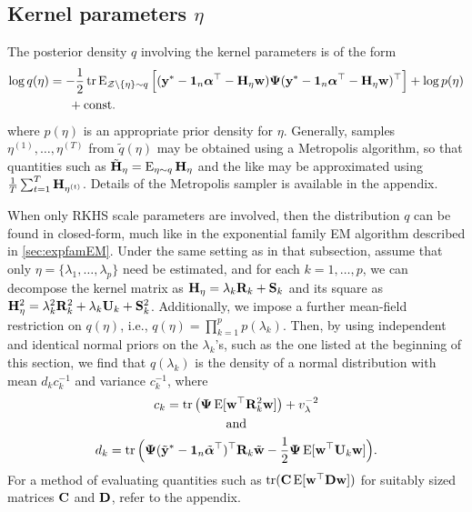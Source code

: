\subsection{Kernel parameters $\eta$}
\label{sec:varupdeta}

The posterior density $q$ involving the kernel parameters is of the form
\begin{align*}
  \log q(\eta) 
  &=  -\frac{1}{2}\operatorname{tr}\operatorname{E}_{{\mathcal Z}\backslash\{\eta\}\sim q} \Big[ 
  ({\mathbf y}^* - {\mathbf 1}_n{\bm\alpha}^\top - {\mathbf H}_\eta{\mathbf w}) {\bm\Psi} ({\mathbf y}^* - {\mathbf 1}_n{\bm\alpha}^\top - {\mathbf H}_\eta{\mathbf w})^\top \Big] + \log p(\eta) \\
  &\phantom{==} + \text{const.}\hspace{0.01em}
\end{align*}
where $p(\eta)$ is an appropriate prior density for $\eta$.
Generally, samples $\eta^{(1)},\dots,\eta^{(T)}$ from $\tilde q(\eta)$ may be obtained using a Metropolis algorithm, so that quantities such as $\tilde{{\mathbf H}}_{\eta} = \operatorname{E}_{\eta \sim q} {\mathbf H}_{\eta}$ and the like may be approximated using $\frac{1}{T}\sum_{t=1}^T {\mathbf H}_{\eta^{(t)}}$.
Details of the Metropolis sampler is available in the appendix.

When only RKHS scale parameters are involved, then the distribution $q$ can be found in closed-form, much like in the exponential family EM algorithm described in \cref{sec:expfamEM}.
Under the same setting as in that subsection, assume that only $\eta = \{\lambda_1,\dots,\lambda_p\}$ need be estimated, and for each $k=1,\dots,p$, we can decompose the kernel matrix as ${\mathbf H}_\eta = \lambda_k {\mathbf R}_k + {\mathbf S}_k$ and its square as ${\mathbf H}_\eta^2 = \lambda_k^2 {\mathbf R}_k^2 + \lambda_k {\mathbf U}_k + {\mathbf S}_k^2$.
Additionally, we impose a further mean-field restriction on $q(\eta)$, i.e., $q(\eta) = \prod_{k=1}^p p(\lambda_k)$.
Then, by using independent and identical normal priors on the $\lambda_k$'s, such as the one listed at the beginning of this section, we find that $q(\lambda_k)$ is the density of a normal distribution with mean $d_kc_k^{-1}$ and variance $c_k^{-1}$, where
\begin{gather*}
  c_k = \operatorname{tr}\big({\bm\Psi}\operatorname{E}[{\mathbf w}^\top{\mathbf R}_k^2{\mathbf w}]\big) + v_\lambda^{-2} \\
  \hspace{0.5cm}\text{and}\hspace{0.5cm} \\
  d_k = \operatorname{tr}\Big({\bm\Psi}(\tilde{{\mathbf y}}^* - {\mathbf 1}_n\tilde{{\bm\alpha}}^\top)^\top{\mathbf R}_k \tilde{{\mathbf w}} 
  - \frac{1}{2}{\bm\Psi}\operatorname{E}[{\mathbf w}^\top {\mathbf U}_k {\mathbf w}] \Big). 
\end{gather*}
For a method of evaluating quantities such as $\operatorname{tr}({\mathbf C}\operatorname{E}[{\mathbf w}^\top{\mathbf D}{\mathbf w} ])$ for suitably sized matrices ${\mathbf C}$ and ${\mathbf D}$, refer to the appendix.

